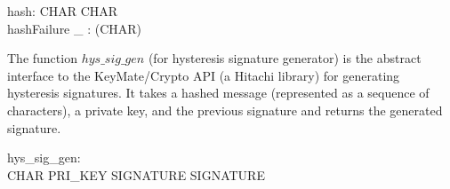 \documentclass[a4paper,pdftex]{article}
\begin{document}
\begin{axdef}
  hash: \seq CHAR \fun \seq CHAR \\
  hashFailure \_ : \power(\seq CHAR)
\end{axdef}

The function $hys\_sig\_gen$
(for hysteresis signature generator)
is the abstract
interface to the KeyMate/Crypto API (a Hitachi library)
for generating hysteresis signatures.
It takes a hashed message (represented as a sequence of characters),
a private key, and the previous signature and returns the generated signature.
\begin{axdef}
  hys\_sig\_gen: \\
  \seq CHAR \cross PRI\_KEY \cross SIGNATURE \fun SIGNATURE
\end{axdef}
\end{document}
